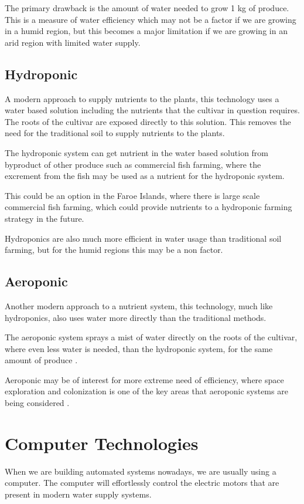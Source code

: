 \documentclass[a4paper,12pt,twoside,openright,titlepage]{book}
\begin{document}
The primary drawback is the amount of water needed to grow 1 kg of produce. This is a measure of water efficiency which may not be a factor if we are growing in a humid region, but this becomes a major limitation if we are growing in an arid region with limited water supply.

\subsection{Hydroponic}
A modern approach to supply nutrients to the plants, this technology uses a water based solution including the nutrients that the cultivar in question requires.
The roots of the cultivar are exposed directly to this solution.
This removes the need for the traditional soil to supply nutrients to the plants.

The hydroponic system can get nutrient in the water based solution from byproduct of other produce such as commercial fish farming, where the excrement from the fish may be used as a nutrient for the hydroponic system.

This could be an option in the Faroe Islands, where there is large scale commercial fish farming, which could provide nutrients to a hydroponic farming strategy in the future.

Hydroponics are also much more efficient in water usage than traditional soil farming, but for the humid regions this may be a non factor.

\subsection{Aeroponic}
Another modern approach to a nutrient system, this technology, much like hydroponics, also uses water more directly than the traditional methods.

The aeroponic system sprays a mist of water directly on the roots of the cultivar, where even less water is needed, than the hydroponic system, for the same amount of produce \cite{aeroponic2}.

Aeroponic may be of interest for more extreme need of efficiency, where space exploration and colonization is one of the key areas that aeroponic systems are being considered \cite{mars_agriculture}.

\section{Computer Technologies}
When we are building automated systems nowadays, we are usually using a computer.
The computer will effortlessly control the electric motors that are present in modern water supply systems.
\end{document}
